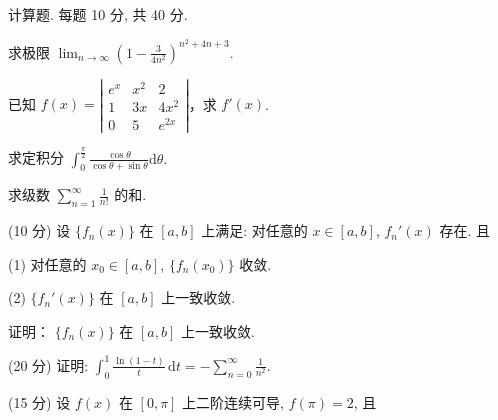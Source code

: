 \par{}
计算题. 每题 10 分, 共 40 分.\par
求极限 $\lim_{n\to \infty}\left(1 - \frac{3}{4n^2}\right)^{n^2 + 4n + 3}.$\par
已知 $f(x) = \left| \begin{array}{ccc} e^x & x^2 & 2 \\ 1 & 3x & 4x^2 \\ 0 & 5 & e^{2x} \end{array} \right|$，求 $f'(x)$.\par
求定积分 $\int_0^{\frac{\pi}{2}}\frac{\cos\theta}{\cos\theta + \sin\theta}\mathrm{d}\theta .$\par
求级数 $\sum_{n=1}^{\infty} \frac{1}{n!}$ 的和.\par
\par{}
(10 分) 设 $\{f_n(x)\}$ 在 $[a, b]$ 上满足: 对任意的 $x \in [a, b]$, $f_n'(x)$ 存在. 且\par
(1) 对任意的 $x_0 \in [a, b]$, $\{f_n(x_0)\}$ 收敛.\par
(2) $\{f_n'(x)\}$ 在 $[a, b]$ 上一致收敛.\par
证明： $\{f_n(x)\}$ 在 $[a,b]$ 上一致收敛.\par
\par{}
(20 分) 证明: $\int_{0}^{1} \frac{\ln(1 - t)}{t} \, \mathrm{d}t = -\sum_{n=0}^{\infty} \frac{1}{n^{2}}$.\par
\par{}
\par{}
(15 分) 设 $f(x)$ 在 $[0, \pi]$ 上二阶连续可导, $f(\pi) = 2$, 且\par
